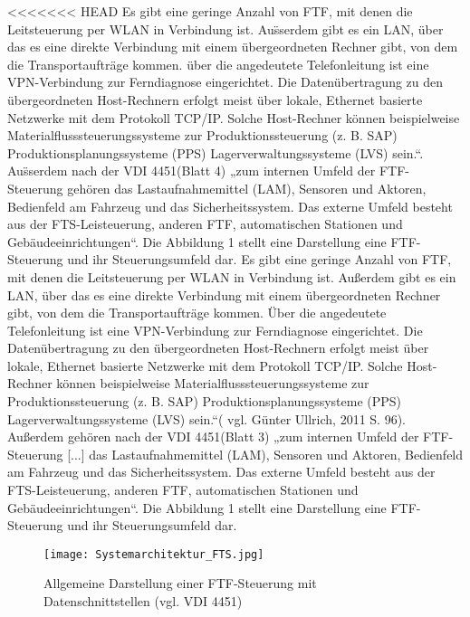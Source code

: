 \begin{itemize}
<<<<<<< HEAD
Es gibt eine geringe Anzahl von FTF, mit denen die Leitsteuerung per WLAN in Verbindung ist. Au\"sserdem gibt es ein LAN, \"uber das es eine direkte Verbindung mit einem \"ubergeordneten Rechner gibt, von dem die Transportauftr\"age kommen. \"uber die angedeutete Telefonleitung ist eine VPN-Verbindung zur Ferndiagnose eingerichtet. Die Daten\"ubertragung zu den \"ubergeordneten Host-Rechnern erfolgt meist \"uber lokale, Ethernet basierte Netzwerke mit dem Protokoll TCP/IP. Solche Host-Rechner k\"onnen beispielweise Materialflusssteuerungssysteme zur Produktionssteuerung (z. B. SAP) Produktionsplanungssysteme (PPS) Lagerverwaltungssysteme (LVS) sein.“\cite[S. 13]{Guenther:2011}. 
Au\"sserdem nach der VDI 4451(Blatt 4) „zum internen Umfeld der FTF-Steuerung geh\"oren das Lastaufnahmemittel (LAM), Sensoren und Aktoren, Bedienfeld am Fahrzeug und das Sicherheitssystem. Das externe Umfeld besteht aus der FTS-Leisteuerung, anderen FTF, automatischen Stationen und Geb\"audeeinrichtungen“. Die Abbildung 1 stellt eine Darstellung eine FTF-Steuerung und ihr Steuerungsumfeld dar.
Es gibt eine geringe Anzahl von FTF, mit denen die Leitsteuerung per WLAN in Verbindung ist.
Au\ss erdem gibt es ein LAN, \"uber das es eine direkte Verbindung mit einem \"ubergeordneten Rechner gibt, von dem die Transportauftr\"age kommen.
\"Uber die angedeutete Telefonleitung ist eine VPN-Verbindung zur Ferndiagnose eingerichtet.
Die Daten\"ubertragung zu den \"ubergeordneten Host-Rechnern erfolgt meist \"uber lokale, Ethernet basierte Netzwerke mit dem Protokoll TCP/IP.
Solche Host-Rechner k\"onnen beispielweise Materialflusssteuerungssysteme zur Produktionssteuerung (z. B. SAP) Produktionsplanungssysteme (PPS) Lagerverwaltungssysteme (LVS) sein.“( vgl. G\"unter Ullrich, 2011 S. 96). 
Au\ss erdem geh\"oren nach der VDI 4451(Blatt 3) „zum internen Umfeld der FTF-Steuerung [...] das Lastaufnahmemittel (LAM), Sensoren und Aktoren, Bedienfeld am Fahrzeug und das Sicherheitssystem.
Das externe Umfeld besteht aus der FTS-Leisteuerung, anderen FTF, automatischen Stationen und Geb\"audeeinrichtungen“.
Die Abbildung 1 stellt eine Darstellung eine FTF-Steuerung und ihr Steuerungsumfeld dar.
	\begin{figure}[h!]
		\centering
		\texttt{[image: Systemarchitektur\_FTS.jpg]}
		\caption{Allgemeine Darstellung einer FTF-Steuerung mit Datenschnittstellen (vgl. VDI 4451)}
		\label{Wertschoepfungskette}
	\end{figure}

\end{itemize}
